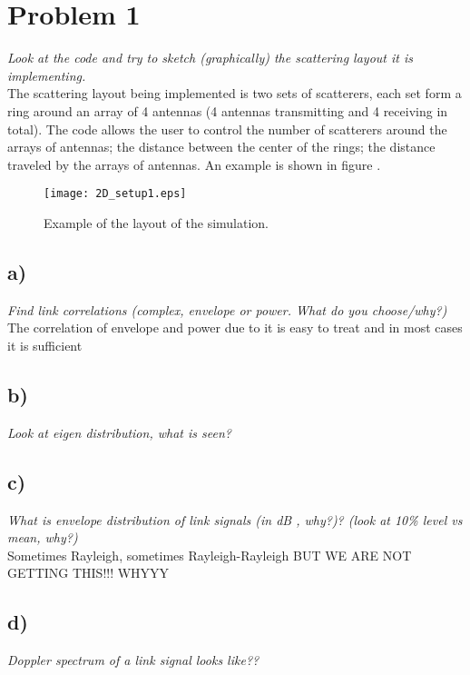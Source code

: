 \section{Problem 1}
\textit{Look at the code and try to sketch (graphically) the scattering layout it is implementing.}\\

The scattering layout being implemented is two sets of scatterers, each set form a ring around an array of 4 antennas (4 antennas transmitting and 4 receiving in total). The code allows the user to control the number of scatterers around the arrays of antennas; the distance between the center of the rings; the distance traveled by the arrays of antennas. An example is shown in figure .

\begin{figure}[!h]
  \centering
  \texttt{[image: 2D\_setup1.eps]}
  \caption{Example of the layout of the simulation.}
  \label{fig:2D_setup1}
\end{figure}

\subsection{a)}
\textit{Find link correlations (complex, envelope or power. What do you choose/why?)}\\

The correlation of envelope and power due to it is easy to treat and in most cases it is sufficient

\subsection{b)}
\textit{Look at eigen distribution, what is seen?}\\



\subsection{c)}
\textit{What is envelope distribution of link signals (in dB , why?)? (look at 10\% level vs mean, why?)}\\

Sometimes Rayleigh, sometimes Rayleigh-Rayleigh BUT WE ARE NOT GETTING THIS!!! WHYYY 

\subsection{d)}
\textit{Doppler spectrum of a link signal looks like??}\\

